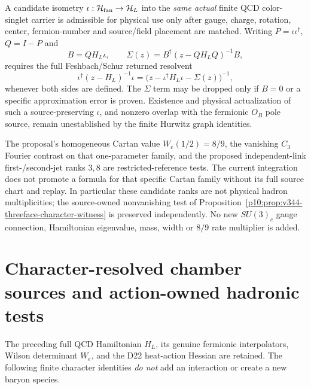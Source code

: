 \documentclass[12pt,a4paper]{article}
\begin{document}
\begin{definition}
\label{p10:def:v365-apbi-hadron-presentation}
A candidate isometry $\iota:\mathcal H_{\rm fan}\to\mathcal H_L$
into the \emph{same actual} finite QCD color-singlet carrier is
admissible for physical use only after gauge, charge, rotation,
center, fermion-number and source/field placement are matched.
Writing $P=\iota\iota^\dagger$, $Q=I-P$ and
\[
B=QH_L\iota,\qquad
\Sigma(z)=B^\dagger(z-QH_LQ)^{-1}B,
\]
requires the full Feshbach/Schur returned resolvent
\[
\iota^\dagger(z-H_L)^{-1}\iota
=\bigl(z-\iota^\dagger H_L\iota-\Sigma(z)\bigr)^{-1},
\]
whenever both sides are defined.  The $\Sigma$ term may be dropped
only if $B=0$ or a specific approximation error is proven.
Existence and physical actualization of such a source-preserving
$\iota$, and nonzero overlap with the fermionic $O_B$ pole source,
remain unestablished by the finite Hurwitz graph identities.
\end{definition}

\begin{remark}
\label{p10:rem:v365-wilson-jets-scope}
The proposal's homogeneous Cartan value $W_e(1/2)=8/9$, the
vanishing $C_3$ Fourier contrast on that one-parameter family,
and the proposed independent-link first-/second-jet ranks $3,8$
are restricted-reference tests.  The current integration does not
promote a formula for that specific Cartan family without its
full source chart and replay.  In particular these candidate ranks
are not physical hadron multiplicities; the source-owned
nonvanishing test of
Proposition~\ref{p10:prop:v344-threeface-character-witness}
is preserved independently.  No new $SU(3)_c$ gauge connection,
Hamiltonian eigenvalue, mass, width or $8/9$ rate multiplier is added.
\end{remark}


\section{Character-resolved chamber sources and action-owned hadronic tests}
\label{p10:sec:v366-hurwitz-physical-source-interface}
The preceding full QCD Hamiltonian $H_L$, its genuine fermionic
interpolators, Wilson determinant $W_e$, and the D22 heat-action
Hessian are retained.  The following finite character identities
\emph{do not} add an interaction or create a new baryon species.
\end{document}
